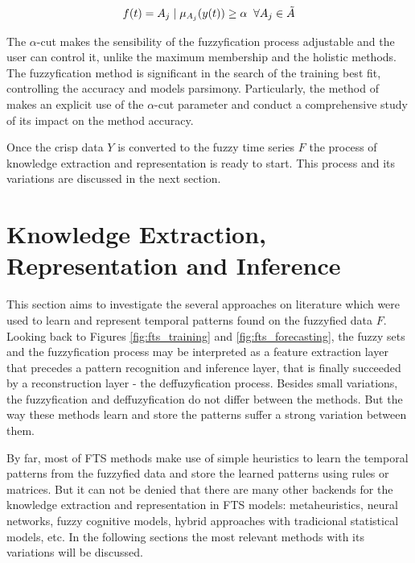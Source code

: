 \begin{equation}
f(t) = A_j\; |\; \mu_{A_j}(y(t)) \geq \alpha \;\; \forall A_j \in \tilde{A}    
\label{eqn:fuzzyfication_alpha}
\end{equation}

The $\alpha$-cut makes the sensibility of the fuzzyfication process adjustable and the user can control it, unlike the maximum membership and the holistic methods. The fuzzyfication method is significant in the search of the training best fit, controlling the accuracy and models parsimony. Particularly, the method of \cite{CarvalhoJr2017} makes an explicit use of the $\alpha$-cut parameter and conduct a comprehensive study of its impact on the method accuracy.

Once the crisp data $Y$ is converted to the fuzzy time series $F$ the process of knowledge extraction and representation is ready to start. This process and its variations are discussed in the next section.

%
\section{Knowledge Extraction, Representation and Inference}
\label{sec:fts_knowledge}

This section aims to investigate the several approaches on literature which were used to learn and represent temporal patterns found on the fuzzyfied data $F$. Looking back to Figures \ref{fig:fts_training} and \ref{fig:fts_forecasting}, the fuzzy sets and the fuzzyfication process may be interpreted as a feature extraction layer that precedes a pattern recognition and inference layer, that is finally succeeded by a reconstruction layer - the deffuzyfication process. Besides small variations, the fuzzyfication and deffuzyfication do not differ between the methods. But the way these methods learn and store the patterns suffer a strong variation between them.

By far, most of FTS methods make use of simple heuristics to learn the temporal patterns from the fuzzyfied data and store the learned patterns using rules or matrices. But it can not be denied that there are many other backends for the knowledge extraction and representation in FTS models: metaheuristics, neural networks, fuzzy cognitive models, hybrid approaches with tradicional statistical models, etc. In the following sections the most relevant methods with its variations will be discussed. 

